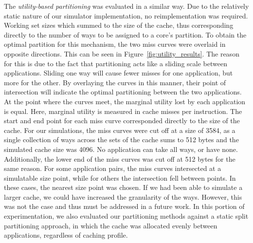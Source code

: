 \documentclass{acm_proc_article-sp}
\begin{document}
The \emph{utility-based partitioning} was evaluated in a similar way.
Due to the relatively static nature of our simulator implementation, no reimplementation
was required. Working set sizes which summed to the size of the cache, thus
corresponding directly to the number of ways to be assigned to a core's partition.
To obtain the optimal partition for this mechanism, the two miss curves were overlaid
in opposite directions. This can be seen in Figure~\ref{fig:utility_results}. The reason for this is due to the fact that partitioning acts like a sliding scale
between applications. Sliding one way will cause fewer misses for one application, but more for the
other. By overlaying the curves in this manner, their point of intersection will indicate the optimal partitioning
between the two applications. At the point where the curves meet, the marginal utility lost by each application
is equal. Here, marginal utility is measured in cache misses per instruction. The start and end point for each miss curve corresponded directly to the size of the cache. For our simulations, the miss curves were cut off at a size of 3584,
as a single collection of ways across the sets of the cache sums to 512 bytes and the simulated cache size was 4096. No
application can take all ways, or have none. Additionally, the lower end of the miss curves was cut off at 512 bytes for the same reason. For some application pairs, the miss curves intersected at a simulatable
size point, while for others the intersection fell between points. In these cases, the nearest size point was chosen. 
If we had been able to simulate a larger cache, we could have increased the granularity of the ways. However,
this was not the case and thus must be addressed in a future work. In this portion of experimentation, we also evaluated
our partitioning methods against a static split partitioning approach, in which the cache was allocated evenly between applications, regardless of caching profile. 
\end{document}

